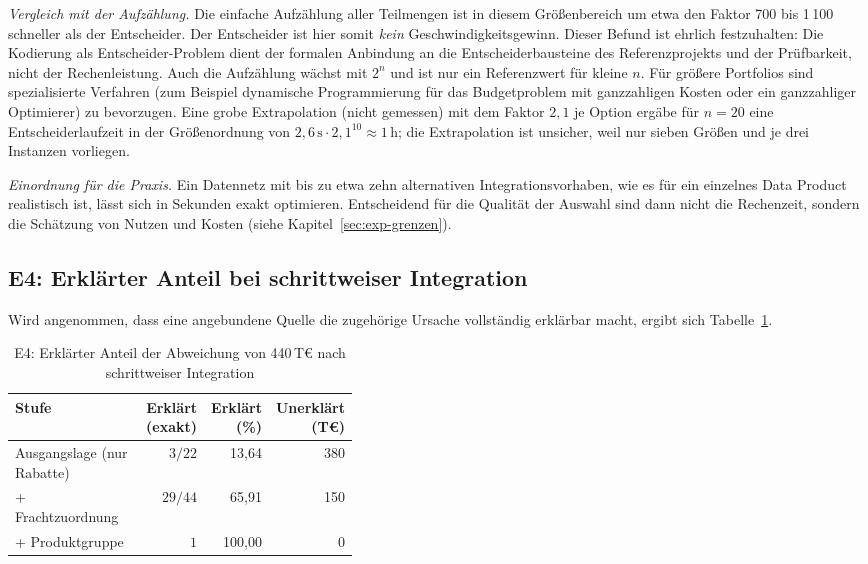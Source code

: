 \documentclass[a4paper,12pt,twoside]{report}
\theoremstyle{definition}
\begin{document}
\emph{Vergleich mit der Aufzählung.} Die einfache Aufzählung aller Teilmengen ist in diesem Größenbereich um etwa den Faktor 700 bis 1\,100 schneller als der Entscheider. Der Entscheider ist hier somit \emph{kein} Geschwindigkeitsgewinn. Dieser Befund ist ehrlich festzuhalten: Die Kodierung als Entscheider-Problem dient der formalen Anbindung an die Entscheiderbausteine des Referenzprojekts und der Prüfbarkeit, nicht der Rechenleistung. Auch die Aufzählung wächst mit $2^n$ und ist nur ein Referenzwert für kleine $n$. Für größere Portfolios sind spezialisierte Verfahren (zum Beispiel dynamische Programmierung für das Budgetproblem mit ganzzahligen Kosten oder ein ganzzahliger Optimierer) zu bevorzugen. Eine grobe Extrapolation (nicht gemessen) mit dem Faktor $2{,}1$ je Option ergäbe für $n=20$ eine Entscheiderlaufzeit in der Größenordnung von $2{,}6\,\mathrm{s}\cdot 2{,}1^{10}\approx 1\,\mathrm{h}$; die Extrapolation ist unsicher, weil nur sieben Größen und je drei Instanzen vorliegen.

\emph{Einordnung für die Praxis.} Ein Datennetz mit bis zu etwa zehn alternativen Integrationsvorhaben, wie es für ein einzelnes Data Product realistisch ist, lässt sich in Sekunden exakt optimieren. Entscheidend für die Qualität der Auswahl sind dann nicht die Rechenzeit, sondern die Schätzung von Nutzen und Kosten (siehe Kapitel~\ref{sec:exp-grenzen}).

\subsection{E4: Erklärter Anteil bei schrittweiser Integration}
Wird angenommen, dass eine angebundene Quelle die zugehörige Ursache vollständig erklärbar macht, ergibt sich Tabelle~\ref{tab:e4}.

\begin{table}[htbp]
\centering
\small
\caption{E4: Erklärter Anteil der Abweichung von 440\,T€ nach schrittweiser Integration}
\label{tab:e4}
\begin{tabular}{p{0.40\linewidth}rrr}
\toprule
\textbf{Stufe} & \textbf{Erklärt (exakt)} & \textbf{Erklärt (\%)} & \textbf{Unerklärt (T€)} \\
\midrule
Ausgangslage (nur Rabatte) & $3/22$ & 13{,}64 & 380 \\
+ Frachtzuordnung & $29/44$ & 65{,}91 & 150 \\
+ Produktgruppe & $1$ & 100{,}00 & 0 \\
\bottomrule
\end{tabular}
\end{table}
\end{document}
